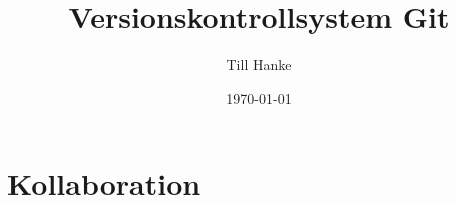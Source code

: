 \documentclass[a4paper]{article}
\title{Versionskontrollsystem Git}\let\Title\@title
\author{Till Hanke}          \let\Author\@author
\date{\today}           \let\Date\@date
\begin{document}

\newpage
\tableofcontents
\newpage


\newpage

%
\newpage

%

%

%
\section{Kollaboration} \label{sec:coop}
%
\newpage
\nocite{*}

\printbibliography
\end{document}
